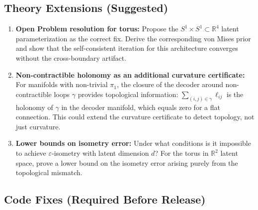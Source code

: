 \documentclass[11pt]{article}
\newcommand{\R}{\mathbb{R}}
\begin{document}
\subsection{Theory Extensions (Suggested)}

\begin{enumerate}
\item \textbf{Open Problem resolution for torus:} Propose the $S^1 \times S^1
\subset \R^4$ latent parameterization as the correct fix. Derive the corresponding
von Mises prior and show that the self-consistent iteration for this architecture
converges without the cross-boundary artifact.

\item \textbf{Non-contractible holonomy as an additional curvature certificate:}
For manifolds with non-trivial $\pi_1$, the closure of the decoder around
non-contractible loops $\gamma$ provides topological information:
$\sum_{(i,j) \in \gamma} \ell_{ij}$ is the holonomy of $\gamma$ in the decoder
manifold, which equals zero for a flat connection. This could extend the curvature
certificate to detect topology, not just curvature.

\item \textbf{Lower bounds on isometry error:} Under what conditions is it
impossible to achieve $\varepsilon$-isometry with latent dimension $d$? For the
torus in $\R^2$ latent space, prove a lower bound on the isometry error arising
purely from the topological mismatch.
\end{enumerate}

\subsection{Code Fixes (Required Before Release)}
\end{document}
